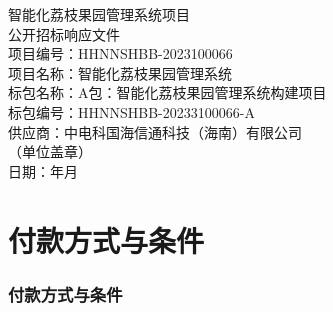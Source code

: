 \documentclass[UTF8,a4paper,zihao=-4]{ctexart}
\newcommand{\BidTitle}{智能化荔枝果园管理系统项目}
\newcommand{\BidDocType}{公开招标响应文件}
\newcommand{\ProjectNo}{HHNNSHBB-2023100066}
\newcommand{\ProjectName}{智能化荔枝果园管理系统}
\newcommand{\PackageName}{A包：智能化荔枝果园管理系统构建项目}
\newcommand{\PackageNo}{HHNNSHBB-20233100066-A}
\newcommand{\SupplierName}{中电科国海信通科技（海南）有限公司}
\newcommand{\BidDate}{\the\year 年\the\month 月}
\begin{document}
\thispagestyle{empty}
\begin{center}
  {\heiti \BidTitle\\[8pt] \BidDocType}\\[36pt]
  {\songti 项目编号：\ProjectNo}\\[8pt]
  {\songti 项目名称：\ProjectName}\\[8pt]
  {\songti 标包名称：\PackageName}\\[8pt]
  {\songti 标包编号：\PackageNo}\\[24pt]
  {\heiti 供应商：\SupplierName}\\[8pt]
  {\songti （单位盖章）}\\[28pt]
  {\songti 日期：\BidDate}
\end{center}
\clearpage

\thispagestyle{empty}
\tableofcontents
\clearpage

\setcounter{page}{1}

\section{付款方式与条件}

\subsubsection{付款方式与条件}
\end{document}
